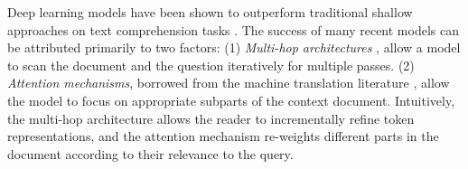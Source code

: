 \documentclass[11pt,a4paper]{article}
\begin{document}


Deep learning models have been shown to outperform traditional shallow approaches
on text comprehension tasks \citep{hermann2015teaching}.
The success of many recent models can be attributed primarily to two factors:
(1) \emph{Multi-hop architectures} 
\citep{weston2014memory, sordoni2016iterative, shen2016reasonet},
allow a model to scan the document and the question iteratively for multiple passes.
(2) \emph{Attention mechanisms},
\citep{chen2016thorough, hermann2015teaching}
borrowed from the machine translation literature \citep{bahdanau2014neural},
allow the model to focus on appropriate subparts of the context document.
Intuitively,
the multi-hop architecture allows the reader to incrementally refine token representations,
and the attention mechanism re-weights different parts in the document according to their relevance to the query.
\end{document}
